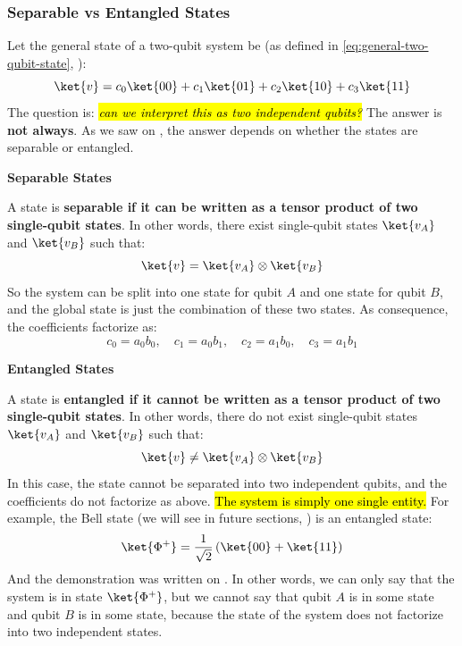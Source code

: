 \subsubsection{Separable vs Entangled States}

Let the general state of a two-qubit system be (as defined in \autoref{eq:general-two-qubit-state}, ):
\begin{equation*}
    \ket{v} = c_{0}\ket{00} + c_{1}\ket{01} + c_{2}\ket{10} + c_{3}\ket{11}
\end{equation*}
The question is: \hl{\emph{can we interpret this as two independent qubits?}} The answer is \textbf{not always}. As we saw on , the answer depends on whether the states are separable or entangled.

\highspace
\begin{flushleft}
    \textcolor{Green3}{ \textbf{Separable States}}
\end{flushleft}
A state is \textbf{separable if it can be written as a tensor product of two single-qubit states}. In other words, there exist single-qubit states $\ket{v_{A}}$ and $\ket{v_{B}}$ such that:
\begin{equation*}
    \ket{v} = \ket{v_{A}} \otimes \ket{v_{B}}
\end{equation*}
So the system can be split into one state for qubit $A$ and one state for qubit $B$, and the global state is just the combination of these two states. As consequence, the coefficients factorize as:
\begin{equation*}
    c_{0} = a_{0}b_{0}, \quad c_{1} = a_{0}b_{1}, \quad c_{2} = a_{1}b_{0}, \quad c_{3} = a_{1}b_{1}
\end{equation*}

\highspace
\begin{flushleft}
    \textcolor{Green3}{ \textbf{Entangled States}}
\end{flushleft}
A state is \textbf{entangled if it cannot be written as a tensor product of two single-qubit states}. In other words, there do not exist single-qubit states $\ket{v_{A}}$ and $\ket{v_{B}}$ such that:
\begin{equation*}
    \ket{v} \neq \ket{v_{A}} \otimes \ket{v_{B}}
\end{equation*}
In this case, the state cannot be separated into two independent qubits, and the coefficients do not factorize as above. \hl{The system is simply one single entity.} For example, the Bell state (we will see in future sections, ) is an entangled state:
\begin{equation*}
    \ket{\Phi^{+}} = \frac{1}{\sqrt{2}}\left(\ket{00} + \ket{11}\right)
\end{equation*}
And the demonstration was written on . In other words, we can only say that the system is in state $\ket{\Phi^{+}}$, but we cannot say that qubit $A$ is in some state and qubit $B$ is in some state, because the state of the system does not factorize into two independent states.

